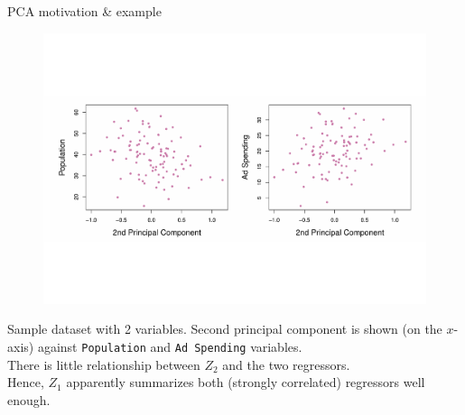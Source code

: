 \documentclass{beamer}
\begin{document}
\begin{frame}{PCA motivation \& example}
\vspace{-2.2cm}
\begin{figure}
\includegraphics[scale=0.40]{IMG/PCAExample4.pdf}
\end{figure}
\vspace{-2cm}
\centering Sample dataset with 2 variables. Second principal component is shown (on the $x$-axis) against \texttt{Population} and \texttt{Ad Spending} variables. \\There is little relationship between $Z_2$ and the two regressors. \\Hence, $Z_1$ apparently summarizes both (strongly correlated) regressors well enough. 
\end{frame}
\end{document}
